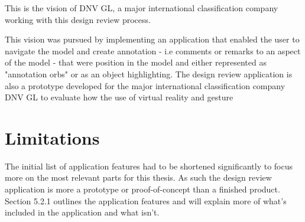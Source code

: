 This is the vision of DNV GL, a major international classification company working with this design review process. 


This vision was pursued by implementing an application that enabled the user to navigate the model and create annotation - 
i.e comments or remarks to an aspect of the model - that were position in the model and either represented as "annotation orbs" or as an object highlighting.
The design review application is also a prototype developed for the major international classification company DNV GL to evaluate how the use of virtual reality and gesture




\section{Limitations}
The initial list of application features had to be shortened significantly to focus more on the most relevant parts for this thesis. As such the design review application
is more a prototype or proof-of-concept than a finished product. Section 5.2.1 outlines the application features and will explain more of what's included in the application and what isn't. 


